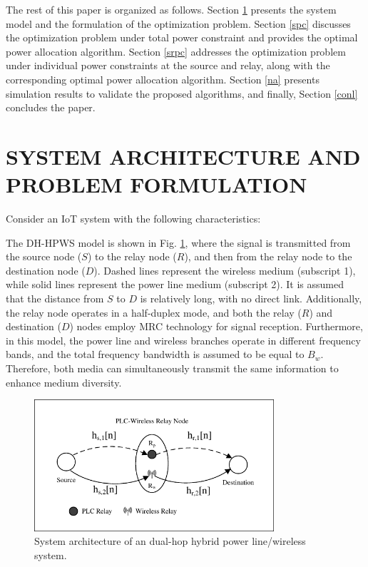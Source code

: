 \documentclass[lettersize,journal]{IEEEtran}
\begin{document}
	The rest of this paper is organized as follows. Section \ref{sec:system} presents the system model and the formulation of the optimization problem. Section \ref{spc} discusses the optimization problem under total power constraint and provides the optimal power allocation algorithm. Section \ref{srpc} addresses the optimization problem under individual power constraints at the source and relay, along with the corresponding optimal power allocation algorithm. Section \ref{na} presents simulation results to validate the proposed algorithms, and finally, Section \ref{conl} concludes the paper.
	

	
	\section{SYSTEM ARCHITECTURE AND PROBLEM FORMULATION}
	\label{sec:system}
	Consider an IoT system with the following characteristics:
	
	The DH-HPWS model is shown in Fig. \ref{fig_sys}, where the signal is transmitted from the source node (\( S \)) to the relay node (\( R \)), and then from the relay node to the destination node (\( D \)). Dashed lines represent the wireless medium (subscript 1), while solid lines represent the power line medium (subscript 2). It is assumed that the distance from \( S \) to \( D \) is relatively long, with no direct link. Additionally, the relay node operates in a half-duplex mode, and both the relay (\( R \)) and destination (\( D \)) nodes employ MRC technology for signal reception. Furthermore, in this model, the power line and wireless branches operate in different frequency bands, and the total frequency bandwidth is assumed to be equal to \( B_w \). Therefore, both media can simultaneously transmit the same information to enhance medium diversity.
		\begin{figure}[!t]
		\centering
		\includegraphics[width=3.5in, trim=10 1 10 1, clip]{system.pdf}
		\caption{System architecture of an dual-hop hybrid power line/wireless system.}
		\label{fig_sys}
	\end{figure}
	
\end{document}
